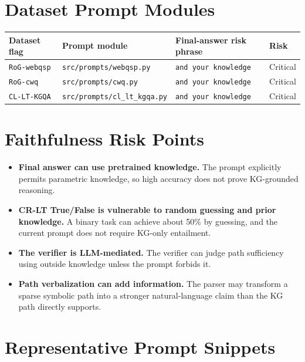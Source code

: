 \documentclass[10pt]{article}
\begin{document}
\section*{Dataset Prompt Modules}

\begin{table}[h]
\centering
\small
\begin{tabular}{llll}
\toprule
Dataset flag & Prompt module & Final-answer risk phrase & Risk \\
\midrule
\texttt{RoG-webqsp} & \texttt{src/prompts/webqsp.py} & \texttt{and your knowledge} & Critical \\
\texttt{RoG-cwq} & \texttt{src/prompts/cwq.py} & \texttt{and your knowledge} & Critical \\
\texttt{CL-LT-KGQA} & \texttt{src/prompts/cl\_lt\_kgqa.py} & \texttt{and your knowledge} & Critical \\
\bottomrule
\end{tabular}
\end{table}

\section*{Faithfulness Risk Points}

\begin{itemize}[leftmargin=1.4em, itemsep=0.35em]
  \item \textbf{Final answer can use pretrained knowledge.}
  The prompt explicitly permits parametric knowledge, so high accuracy does not prove KG-grounded reasoning.

  \item \textbf{CR-LT True/False is vulnerable to random guessing and prior knowledge.}
  A binary task can achieve about 50\% by guessing, and the current prompt does not require KG-only entailment.

  \item \textbf{The verifier is LLM-mediated.}
  The verifier can judge path sufficiency using outside knowledge unless the prompt forbids it.

  \item \textbf{Path verbalization can add information.}
  The parser may transform a sparse symbolic path into a stronger natural-language claim than the KG path directly supports.
\end{itemize}

\section*{Representative Prompt Snippets}
\end{document}
